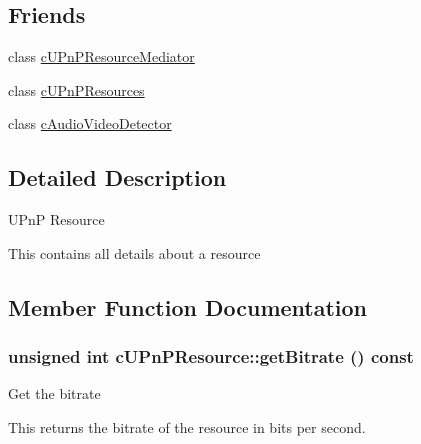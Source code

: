 \subsection*{Friends}
\begin{CompactItemize}
\item 
\hypertarget{classcUPnPResource_61e899959de76787a31b2caf642893f5}{
class \hyperlink{classcUPnPResource_61e899959de76787a31b2caf642893f5}{cUPnPResourceMediator}}
\label{classcUPnPResource_61e899959de76787a31b2caf642893f5}

\item 
\hypertarget{classcUPnPResource_bd3fceb5edae16f35b23748913128356}{
class \hyperlink{classcUPnPResource_bd3fceb5edae16f35b23748913128356}{cUPnPResources}}
\label{classcUPnPResource_bd3fceb5edae16f35b23748913128356}

\item 
\hypertarget{classcUPnPResource_41bb7e713331591ea53b89d0019b101a}{
class \hyperlink{classcUPnPResource_41bb7e713331591ea53b89d0019b101a}{cAudioVideoDetector}}
\label{classcUPnPResource_41bb7e713331591ea53b89d0019b101a}

\end{CompactItemize}


\subsection{Detailed Description}
UPnP Resource

This contains all details about a resource 

\subsection{Member Function Documentation}
\hypertarget{classcUPnPResource_3f2f3d5c447fee28d3dff5cf739e4c98}{
\subsubsection[{getBitrate}]{\setlength{\rightskip}{0pt plus 5cm}unsigned int cUPnPResource::getBitrate () const}}
\label{classcUPnPResource_3f2f3d5c447fee28d3dff5cf739e4c98}


Get the bitrate

This returns the bitrate of the resource in bits per second.

